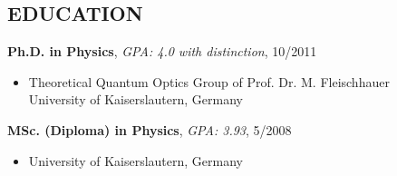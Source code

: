 \documentclass[10pt,centered]{./res} %
\begin{document}
\begin{resume}
\section{\color{ResumeBlue}EDUCATION}

{\bf Ph.D. in Physics}, {\it GPA: 4.0 with distinction}, 10/2011
\begin{itemize}
 \item[] Theoretical Quantum Optics Group of Prof. Dr. M. Fleischhauer\\ University of Kaiserslautern, Germany
\end{itemize}
\vspace*{-0.2cm}
{\bf MSc. (Diploma) in Physics}, {\it GPA: 3.93}, 5/2008
\begin{itemize}
 \item[] University of Kaiserslautern, Germany
\end{itemize}




\end{resume}
\end{document}

